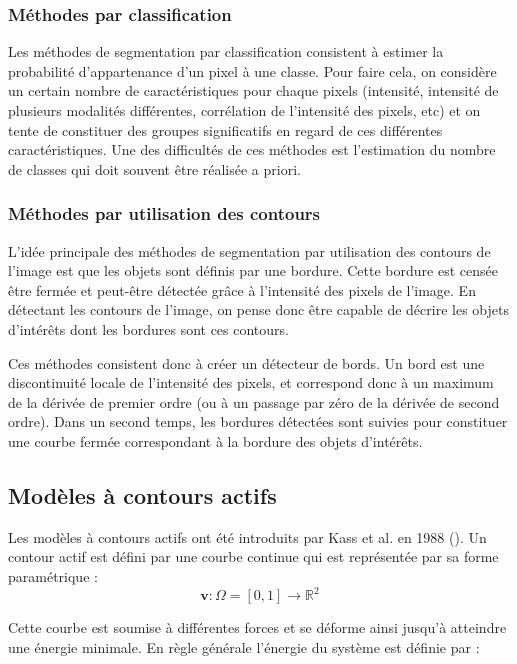 \subsubsection*{Méthodes par classification}
Les méthodes de segmentation par classification consistent à estimer la probabilité d'appartenance d'un pixel à une classe. Pour faire cela, on considère un certain nombre de caractéristiques pour chaque pixels (intensité, intensité de plusieurs modalités différentes, corrélation de l'intensité des pixels, etc) et on tente de constituer des groupes significatifs en regard de ces différentes caractéristiques. Une des difficultés de ces méthodes est l'estimation du nombre de classes qui doit souvent être réalisée a priori.


\subsubsection*{Méthodes par utilisation des contours}

L'idée principale des méthodes de segmentation par utilisation des contours de l'image est que les objets sont définis par une bordure. Cette bordure est censée être fermée et peut-être détectée grâce à l'intensité des pixels de l'image. En détectant les contours de l'image, on pense donc être capable de décrire les objets d'intérêts dont les bordures sont ces contours.

Ces méthodes consistent donc à créer un détecteur de bords. Un bord est une discontinuité locale de l'intensité des pixels, et correspond donc à un maximum de la dérivée de premier ordre (ou à un passage par zéro de la dérivée de second ordre). Dans un second temps, les bordures détectées sont suivies pour constituer une courbe fermée correspondant à la bordure des objets d'intérêts.




\subsection{Modèles à contours actifs}

Les modèles à contours actifs ont été introduits par Kass et al. en 1988 (\cite{kaas}). Un contour actif est défini par une courbe continue qui est représentée par sa forme paramétrique :
\begin{equation*}
\mathbf{v} : \Omega =[0,1] \rightarrow \mathbb{R}^2
\end{equation*}

Cette courbe est soumise à différentes forces et se déforme ainsi jusqu'à atteindre une énergie minimale. En règle générale l'énergie du système est définie par : 

